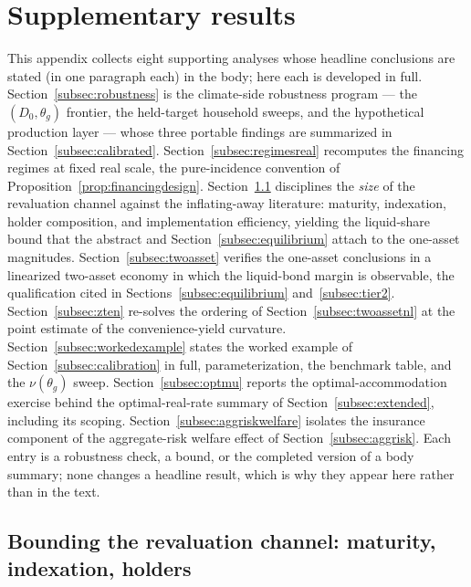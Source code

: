 \documentclass[12pt]{article}
\begin{document}
\section{Supplementary results}\label{app:supp}
This appendix collects eight supporting analyses whose headline conclusions
are stated (in one paragraph each) in the body; here each is developed
in full. Section~\ref{subsec:robustness} is the climate-side robustness
program --- the $(D_0,\theta_g)$ frontier, the held-target household
sweeps, and the hypothetical production layer --- whose three portable
findings are summarized in Section~\ref{subsec:calibrated}.
Section~\ref{subsec:regimesreal} recomputes the financing regimes at fixed
real scale, the pure-incidence convention of
Proposition~\ref{prop:financingdesign}. Section~\ref{subsec:maturity} disciplines the \emph{size} of the
revaluation channel against the inflating-away literature: maturity,
indexation, holder composition, and implementation efficiency, yielding the
liquid-share bound that the abstract and Section~\ref{subsec:equilibrium}
attach to the one-asset magnitudes. Section~\ref{subsec:twoasset} verifies
the one-asset conclusions in a linearized two-asset economy in which the
liquid-bond margin is observable, the qualification cited in
Sections~\ref{subsec:equilibrium} and~\ref{subsec:tier2}.
Section~\ref{subsec:zten} re-solves the ordering of
Section~\ref{subsec:twoassetnl} at the
\citeauthor{krishnamurthy2012} point estimate of the convenience-yield
curvature.
Section~\ref{subsec:workedexample} states the worked example of
Section~\ref{subsec:calibration} in full, parameterization, the benchmark
table, and the $\nu(\theta_g)$ sweep. Section~\ref{subsec:optmu} reports the
optimal-accommodation exercise behind the optimal-real-rate summary of
Section~\ref{subsec:extended}, including its scoping.
Section~\ref{subsec:aggriskwelfare} isolates the insurance component of
the aggregate-risk welfare effect of Section~\ref{subsec:aggrisk}. Each entry is a robustness check, a bound, or the completed
version of a body summary; none changes a headline result, which is why
they appear here rather than in the text.

\subsection{Bounding the revaluation channel: maturity, indexation, holders}
\label{subsec:maturity}
\end{document}
